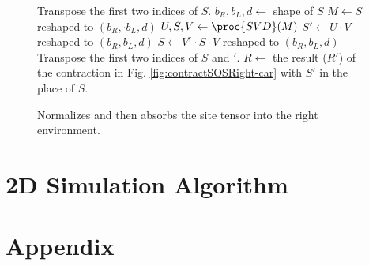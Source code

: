 \documentclass{article}
\begin{document}
\begin{figure}
\begin{codebox}
\li Transpose the first two indices of $S$.
\li $b_R, b_L, d \gets $ shape of $S$
\li $M \gets S$ reshaped to $(b_R,\cdot b_L, d)$
\li $U, S, V \gets \proc{SVD}(M)$
\li $S' \gets U\cdot V$ reshaped to $(b_R,b_L, d)$
\li $S \gets V^\dagger \cdot S \cdot V$ reshaped to $(b_R,b_L, d)$
\li Transpose the first two indices of $S$ and $'$.
\li $R \gets $ the result ($R'$) of the contraction in Fig. \ref{fig:contractSOSRight-car} with $S'$ in the place of $S$.
\end{codebox}
\caption{\label{code:Absorb-Site-Right} Normalizes and then absorbs the site tensor into the right environment.}
\end{figure}


\part{2D Simulation Algorithm}
\label{2dsim}

\part{Appendix}
\end{document}
